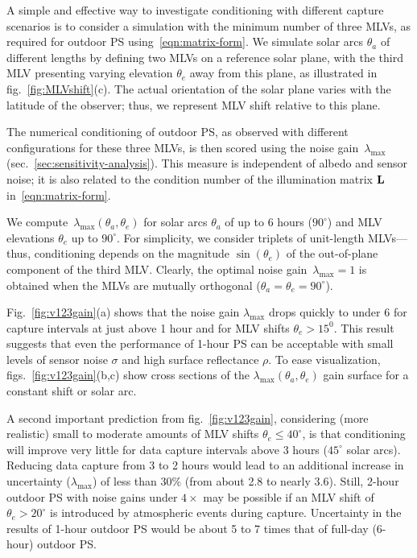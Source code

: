 A simple and effective way to investigate conditioning with different capture scenarios is to consider a simulation with the minimum number of three MLVs, as required for outdoor PS using~\eqref{eqn:matrix-form}. We simulate solar arcs $\theta_a$ of different lengths by defining two MLVs on a reference solar plane, with the third MLV presenting varying elevation $\theta_e$ away from this plane, as illustrated in fig.~\ref{fig:MLVshift}(c). The actual orientation of the solar plane varies with the latitude of the observer; thus, we represent MLV shift relative to this plane.

The numerical conditioning of outdoor PS, as observed with different configurations for these three MLVs, is then scored using the noise gain~$\lambda_{\max}$ (sec.~\ref{sec:sensitivity-analysis}). This measure is independent of albedo and sensor noise; it is also related to the condition number of the illumination matrix ${\bf L}$ in~\eqref{eqn:matrix-form}.



We compute~$\lambda_{\max}(\theta_a,\theta_e)$ for solar arcs $\theta_a$ of up to 6 hours ($90^\circ$) and MLV elevations $\theta_e$ up to $90^\circ$. For simplicity, we consider triplets of unit-length MLVs---thus, conditioning depends on the magnitude $\sin(\theta_e)$ of the out-of-plane component of the third MLV. Clearly, the optimal noise gain~$\lambda_{\max} = 1$ is obtained when the MLVs are mutually orthogonal ($\theta_a = \theta_e = 90^\circ$).

Fig.~\ref{fig:v123gain}(a) shows that the noise gain $\lambda_{\max}$ drops quickly to under 6 for capture intervals at just above 1 hour and for MLV shifts $\theta_e > 15^0$. This result suggests that even the performance of 1-hour PS can be acceptable with small levels of sensor noise $\sigma$ and high surface reflectance $\rho$. To ease visualization, figs.~\ref{fig:v123gain}(b,c) show cross sections of the $\lambda_{\max}(\theta_a,\theta_e)$ gain surface for a constant shift or solar arc.

A second important prediction from fig.~\ref{fig:v123gain}, considering (more realistic) small to moderate amounts of MLV shifts $\theta_e \leq 40^\circ$, is that conditioning will improve very little for data capture intervals above 3 hours ($45^\circ$ solar arcs). Reducing data capture from 3 to 2 hours would lead to an additional increase in uncertainty ($\lambda_{\max}$) of less than $30\%$ (from about 2.8 to nearly 3.6). Still, 2-hour outdoor PS with noise gains under $4\times$ may be possible if an MLV shift of $\theta_e > 20^\circ$ is introduced by atmospheric events during capture. Uncertainty in the results of 1-hour outdoor PS would be about 5 to 7 times that of full-day (6-hour) outdoor PS.


